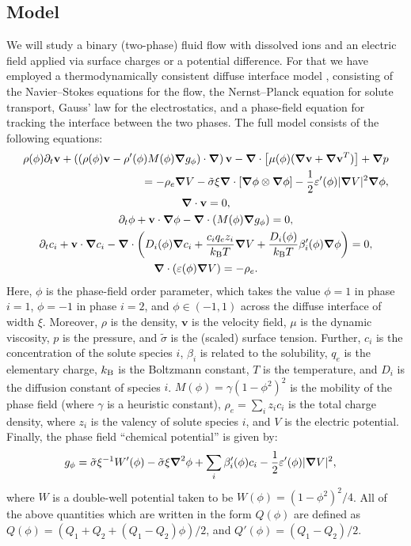 \documentclass[a4paper,10pt]{article}
\renewcommand{\v}[1]{\mathbf{#1}}
\renewcommand{\v}[1]{\ensuremath{\mathbf{#1}}} %
\newcommand{\gv}[1]{\ensuremath{\mbox{\boldmath$ #1 $}}}
\newcommand{\grad}[1]{\gv{\nabla} #1} %
\renewcommand{\div}[1]{\gv{\nabla} \cdot #1} %
\newcommand{\laplacian}[1]{\grad^2 #1}
\newcommand{\pdt}[1]{\partial_t #1}
\begin{document}
\subsection*{Model}
We will study a binary (two-phase) fluid flow with dissolved ions and an electric field applied via surface charges or a potential difference.
For that we have employed a thermodynamically consistent diffuse interface model \cite{abels2012}, consisting of the Navier--Stokes equations for the flow, the Nernst--Planck equation for solute transport, Gauss' law for the electrostatics, and a phase-field equation for tracking the interface between the two phases.
The full model consists of the following equations:
\begin{gather}
  \begin{split}
  \rho(\phi) \pdt \v v + \left( \left(\rho(\phi) \v v - \rho'(\phi) M(\phi) \grad g_\phi  \right) \cdot \grad \right) \v v - \div \left[  \mu(\phi)(\grad \v v + \grad \v v ^T) \right] + \grad p \\
  = - \rho_e \grad V - \tilde \sigma \xi\div \left[ \grad \phi \otimes \grad \phi \right] - \frac 1 2 \varepsilon'(\phi) | \grad V |^2 \grad \phi,
  \end{split}\\
  \div \v v = 0, \\
  \pdt \phi + \v v \cdot \grad \phi - \div(M(\phi) \grad g_\phi ) = 0, \\
  \pdt c_i + \v v \cdot \grad c_i - \div \left( D_{i} (\phi) \grad c_i + \frac{c_i q_e  z_i}{k_{\rm B} T} \grad V +\frac{D_i(\phi)}{k_{\rm B} T}\beta_i'(\phi) \grad \phi \right) = 0, \\
  \div ( \varepsilon (\phi) \grad V ) = - \rho_e.
\end{gather}
Here, $\phi$ is the phase-field order parameter, which takes the value $\phi = 1$ in phase $i=1$, $\phi = -1$ in phase $i=2$, and $\phi \in (-1, 1)$ across the diffuse interface of width $\xi$.
Moreover, $\rho$ is the density, $\v v$ is the velocity field, $\mu$ is the dynamic viscosity, $p$ is the pressure, and $\tilde{\sigma}$ is the (scaled) surface tension.
Further, $c_i$ is the concentration of the solute species $i$, $\beta_i$ is related to the solubility, $q_e$ is the elementary charge, $k_{\rm B}$ is the Boltzmann constant, $T$ is the temperature, and $D_i$ is the diffusion constant of species $i$. $M(\phi)= \gamma (1 - \phi^2)^2$ is the mobility of the phase field (where $\gamma$ is a heuristic constant), $\rho_e = \sum_i z_i c_i$ is the total charge density, where $z_i$ is the valency of solute species $i$, and $V$ is the electric potential. Finally, the phase field ``chemical potential'' is given by:
\begin{align}
 g_\phi &= \tilde\sigma\xi^{-1}W'(\phi) - \tilde\sigma\xi\laplacian\phi + \sum_i \beta_i'(\phi) c_i - \frac 1 2 \varepsilon'(\phi) | \grad V |^2 ,
\end{align}
where $W$ is a double-well potential taken to be $W(\phi) = (1 - \phi^2)^2/4$.
All of the above quantities which are written in the form $Q(\phi)$ are defined as $Q(\phi) = (Q_1+Q_2 + (Q_1-Q_2)\phi)/2$, and $Q'(\phi) = (Q_1-Q_2)/2$.
\end{document}
